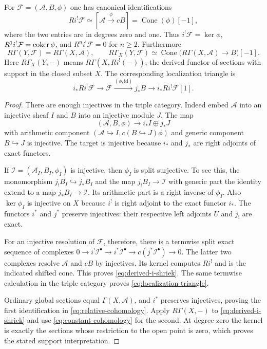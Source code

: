 \begin{theorem}
\label{thm:derived}
For $\mathcal F=(\mathcal A,B,\phi)$ one has canonical identifications
\[
 Ri^!\mathcal F\simeq
 [\mathcal A\xrightarrow{\phi}cB]
 =\operatorname{Cone}(\phi)[-1],
 \tag{RP7}\label{eq:derived-i-shriek}
\]
where the two entries are in degrees zero and one. Thus
$i^!\mathcal F=\ker\phi$, $R^1i^!\mathcal F=\operatorname{coker}\phi$, and
$R^ni^!\mathcal F=0$ for $n\ge2$.
Furthermore
\[
 R\Gamma(Y,\mathcal F)=R\Gamma(X,\mathcal A),\qquad
 R\Gamma_X(Y,\mathcal F)
 \simeq\operatorname{Cone}\bigl(R\Gamma(X,\mathcal A)\to B\bigr)[-1].
 \tag{RP8}\label{eq:relative-cohomology}
\]
Here $R\Gamma_X(Y,-)$ means $R\Gamma(X,Ri^!(-))$, the derived functor
of sections with support in the closed subset $X$. The corresponding
localization triangle is
\[
 i_*Ri^!\mathcal F\longrightarrow\mathcal F
 \xrightarrow{(\phi,\mathrm{id})}j_*B\longrightarrow i_*Ri^!\mathcal F[1].
 \tag{RP9}\label{eq:localization-triangle}
\]
\end{theorem}
\begin{proof}
There are enough injectives in the triple category. Indeed embed
$\mathcal A$ into an injective sheaf $I$ and $B$ into an injective
module $J$. The map
\[
 (\mathcal A,B,\phi)\longrightarrow i_*I\oplus j_*J
\]
with arithmetic component $(\mathcal A\hookrightarrow I,c(B\hookrightarrow
J)\phi)$ and generic component $B\hookrightarrow J$ is injective.
The target is injective because $i_*$ and $j_*$ are right adjoints
of exact functors.

If $\mathcal I=(\mathcal A_I,B_I,\phi_I)$ is injective, then
$\phi_I$ is split surjective. To see this, the monomorphism
$j_!B_I\hookrightarrow j_*B_I$ and the map $j_!B_I\to\mathcal I$
with generic part the identity extend to a map $j_*B_I\to\mathcal I$.
Its arithmetic part is a right inverse of $\phi_I$. Also
$\ker\phi_I$ is injective on $X$ because $i^!$ is right adjoint to the
exact functor $i_*$. The functors $i^*$ and $j^*$ preserve injectives:
their respective left adjoints $U$ and $j_!$ are exact.

For an injective resolution of $\mathcal F$, therefore, there is a
termwise split exact sequence of complexes
$0\to i^!\mathcal I^\bullet\to i^*\mathcal I^\bullet
\to c(j^*\mathcal I^\bullet)\to0$. The latter two complexes resolve
$\mathcal A$ and $cB$ by injectives. Its kernel computes $Ri^!$ and
is the indicated shifted cone. This proves \eqref{eq:derived-i-shriek}.
The same termwise calculation in the triple category proves
\eqref{eq:localization-triangle}.

Ordinary global sections equal $\Gamma(X,\mathcal A)$, and $i^*$
preserves injectives, proving the first identification in
\eqref{eq:relative-cohomology}. Apply $R\Gamma(X,-)$ to
\eqref{eq:derived-i-shriek} and use
\eqref{eq:constant-cohomology} for the second. At degree zero the
kernel is exactly the sections whose restriction to the open point
is zero, which proves the stated support interpretation.
\end{proof}


